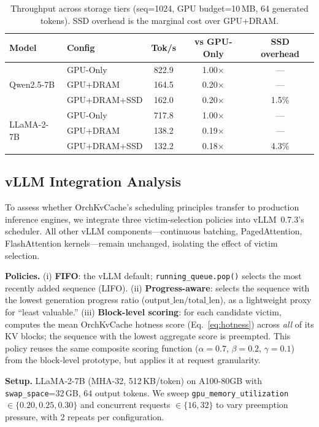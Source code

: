 \documentclass[conference]{IEEEtran}
\begin{document}
\begin{table}[t]
\centering
\caption{Throughput across storage tiers (seq=1024, GPU budget=10\,MB, 64 generated tokens). SSD overhead is the marginal cost over GPU+DRAM.}
\label{tab:tier-throughput}
\small
\begin{tabular}{@{}llccc@{}}
\toprule
Model & Config & Tok/s & vs GPU-Only & SSD overhead \\
\midrule
\multirow{3}{*}{Qwen2.5-7B}
  & GPU-Only       & 822.9 & 1.00$\times$ & --- \\
  & GPU+DRAM       & 164.5 & 0.20$\times$ & --- \\
  & GPU+DRAM+SSD   & 162.0 & 0.20$\times$ & 1.5\% \\
\midrule
\multirow{3}{*}{LLaMA-2-7B}
  & GPU-Only       & 717.8 & 1.00$\times$ & --- \\
  & GPU+DRAM       & 138.2 & 0.19$\times$ & --- \\
  & GPU+DRAM+SSD   & 132.2 & 0.18$\times$ & 4.3\% \\
\bottomrule
\end{tabular}
\end{table}

\subsection{vLLM Integration Analysis}
\label{sec:vllm-integration}

To assess whether OrchKvCache's scheduling principles transfer to production inference engines, we integrate three victim-selection policies into vLLM~0.7.3's scheduler. All other vLLM components---continuous batching, PagedAttention, FlashAttention kernels---remain unchanged, isolating the effect of victim selection.

\textbf{Policies.} (i) \textbf{FIFO}: the vLLM default; \texttt{running\_queue.pop()} selects the most recently added sequence (LIFO). (ii) \textbf{Progress-aware}: selects the sequence with the lowest generation progress ratio ($\text{output\_len} / \text{total\_len}$), as a lightweight proxy for ``least valuable.'' (iii) \textbf{Block-level scoring}: for each candidate victim, computes the mean OrchKvCache hotness score (Eq.~\ref{eq:hotness}) across \emph{all} of its KV blocks; the sequence with the lowest aggregate score is preempted. This policy reuses the same composite scoring function ($\alpha{=}0.7$, $\beta{=}0.2$, $\gamma{=}0.1$) from the block-level prototype, but applies it at request granularity.

\textbf{Setup.} LLaMA-2-7B (MHA-32, 512\,KB/token) on A100-80GB with \texttt{swap\_space}=32\,GB, 64 output tokens. We sweep \texttt{gpu\_memory\_utilization} $\in \{0.20, 0.25, 0.30\}$ and concurrent requests $\in \{16, 32\}$ to vary preemption pressure, with 2 repeats per configuration.
\end{document}
